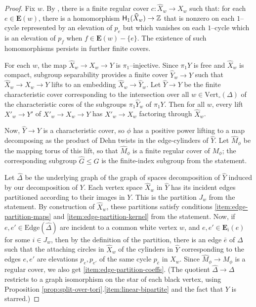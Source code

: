 \documentclass[11pt,oneside]{amsart}
\theoremstyle{definition}
\newcommand{\homology}{\ensuremath{{\sf{H}}}}
\newcommand{\field}[1]{\mathbb{#1}}
\newcommand{\integers}{\ensuremath{\field{Z}}}
\newcommand{\vertices}{\mathrm{Vert}}
\newcommand{\edges}{\mathrm{Edge}}
\begin{document}
\begin{proof}
Fix $w$.  By \cite[Cor. 3.18]{Wise:omnipotence}, there is a finite regular cover $c:\widehat X_w\to X_w$ such that: for each $e\in\mathbf E(w)$, there is a homomorphism $\homology_1(\widehat X_w)\to \integers$ that is nonzero on each $1$--cycle represented by an elevation of $p_e$ but which vanishes on each $1$--cycle which is an elevation of $p_f$ when $f\in\mathbf E(w)-\{e\}$.  The existence of such homomorphisms persists in further finite covers. 

For each $w$, the map $\widehat X_w\to X_w\to Y$ is $\pi_1$--injective.  Since $\pi_1Y$ is free and $\widehat X_w$ is compact, subgroup separability provides a finite cover $\widehat Y_w\to Y$ such that $\widehat X_w\to X_w\to Y$ lifts to an embedding $\widehat X_w\to \widehat Y_w$.  Let $\widehat Y\to Y$ be the finite characteristic cover corresponding to the intersection over all $w\in\vertices_\circ(\Delta)$ of the characteristic cores of the subgroups $\pi_1\widehat Y_w$ of $\pi_1Y$.  Then for all $w$, every lift $X'_w\to Y'$ of $X'_w\to X_w\to Y$ has $X'_w\to X_w$ factoring through $\widehat X_w$. 

Now, $\widehat Y\to Y$ is a characteristic cover, so $\phi$ has a positive power lifting to a map decomposing as the product of Dehn twists in the edge-cylinders of $\widehat Y$.  Let $\widehat M_\phi$ be the mapping torus of this lift, so that $\widehat M_\phi$ is a finite regular cover of $M_\phi$; the corresponding subgroup $\widehat G\leq G$ is the finite-index subgroup from the statement.

Let $\widehat\Delta$ be the underlying graph of the graph of spaces decomposition of $\widehat Y$ induced by our decomposition of $Y$.  Each vertex space $\widehat X_w$ in $\widehat Y$ has its incident edges partitioned according to their images in $Y$.  This is the partition $J_w$ from the statement.  By construction of $\widehat X_w$, these partitions satisfy conditions \eqref{item:edge-partition-maps} and \eqref{item:edge-partition-kernel} from the statement.  Now, if $e,e'\in\edges(\widehat\Delta)$ are incident to a common white vertex $w$, and $e,e'\in \mathbf E_i(e)$ for some $i\in J_w$, then by the definition of the partition, there is an edge $\bar e$ of $\Delta$ such that the attaching circles in $\widehat X_w$ of the cylinders in $\widehat Y$ corresponding to the edges $e,e'$ are elevations $p_e,p_{e'}$ of the same cycle $p_{\bar e}$ in $X_w$.  Since $\widehat M_\phi\to M_\phi$ is a regular cover, we also get \eqref{item:edge-partition-coeffs}.  (The quotient $\widehat\Delta\to\Delta$ restricts to a graph isomorphism on the star of each black vertex, using Proposition \ref{prop:split-over-tori}.\eqref{item:linear-bipartite} and the fact that $Y$ is starred.)  
\end{proof}
\end{document}
